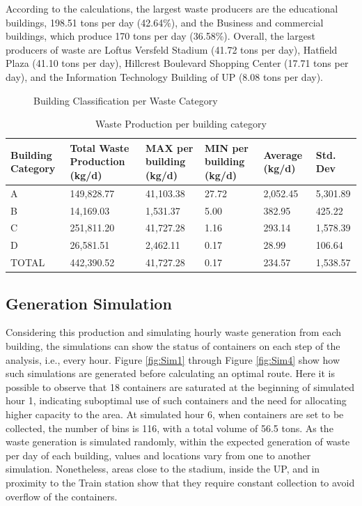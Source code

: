 \documentclass[authoryear,preprint,review,12pt]{elsarticle}
\begin{document}
    According to the calculations, the largest waste producers are the educational buildings, 198.51 tons per day (42.64\%), and the Business and commercial buildings, which produce 170 tons per day (36.58\%). Overall, the largest producers of waste are Loftus Versfeld Stadium (41.72 tons per day), Hatfield Plaza (41.10 tons per day), Hillcrest Boulevard Shopping Center (17.71 tons per day), and the Information Technology Building of UP (8.08 tons per day).
    \begin{figure}
        \caption{Building Classification per Waste Category}
        \label{fig:buildWaste}
    \end{figure}

    \begin{table}
        \centering
        \caption{Waste Production per building category}
        \scriptsize
        \label{tab:Waste2}
        \begin{tabularx}{\linewidth}{l XXXXX}
            \toprule
            Building Category&Total Waste Production (kg/d)&MAX per building (kg/d)&MIN per building (kg/d)&Average (kg/d)& Std. Dev\\ 
            \midrule
            A&149,828.77&41,103.38&27.72&2,052.45&5,301.89\\
            B&14,169.03&1,531.37&5.00&382.95&425.22\\
            C&251,811.20&41,727.28&1.16&293.14&1,578.39\\
            D&26,581.51&2,462.11&0.17&28.99&106.64\\
            \midrule
            TOTAL&442,390.52&41,727.28&0.17&234.57&1,538.57\\
            \bottomrule
        \end{tabularx}
    \end{table}

    \subsection{Generation Simulation} \label{subsec:Simulation}

    Considering this production and simulating hourly waste generation from each building, the simulations can show the status of containers on each step of the analysis, i.e., every hour. Figure \ref{fig:Sim1} through Figure \ref{fig:Sim4} show how such simulations are generated before calculating an optimal route. Here it is possible to observe that 18 containers are saturated at the beginning of simulated hour 1, indicating suboptimal use of such containers and the need for allocating higher capacity to the area. At simulated hour 6, when containers are set to be collected, the number of bins is 116, with a total volume of 56.5 tons. As the waste generation is simulated randomly, within the expected generation of waste per day of each building, values and locations vary from one to another simulation. Nonetheless, areas close to the stadium, inside the UP, and in proximity to the Train station show that they require constant collection to avoid overflow of the containers.
\end{document}
